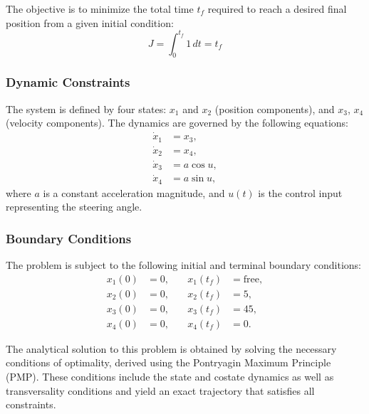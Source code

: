 The objective is to minimize the total time \( t_f \) required to reach a desired final position from a given initial condition:
\begin{equation}
J = \int_0^{t_f} 1 \, dt = t_f
\tag*{\hfill Objective Function}
\label{eq:lts_obj}
\end{equation}

\subsubsection*{Dynamic Constraints}

The system is defined by four states: \( x_1 \) and \( x_2 \) (position components), and \( x_3 \), \( x_4 \) (velocity components). The dynamics are governed by the following equations:
\begin{equation}
\begin{aligned}
    \dot{x}_1 &= x_3, \\
    \dot{x}_2 &= x_4, \\
    \dot{x}_3 &= a \cos u, \\
    \dot{x}_4 &= a \sin u,
\end{aligned}
\tag*{\hfill System Dynamics}
\label{eq:lts_dynamics}
\end{equation}
where \( a \) is a constant acceleration magnitude, and \( u(t) \) is the control input representing the steering angle.

\subsubsection*{Boundary Conditions}

The problem is subject to the following initial and terminal boundary conditions:
\begin{equation}
\begin{aligned}
    x_1(0) &= 0, &\quad x_1(t_f) &= \text{free}, \\
    x_2(0) &= 0, &\quad x_2(t_f) &= 5, \\
    x_3(0) &= 0, &\quad x_3(t_f) &= 45, \\
    x_4(0) &= 0, &\quad x_4(t_f) &= 0.
\end{aligned}
\tag*{\hfill Boundary Conditions}
\label{eq:lts_bc}
\end{equation}

The analytical solution to this problem is obtained by solving the necessary conditions of optimality, derived using the Pontryagin Maximum Principle (PMP). These conditions include the state and costate dynamics as well as transversality conditions and yield an exact trajectory that satisfies all constraints.

